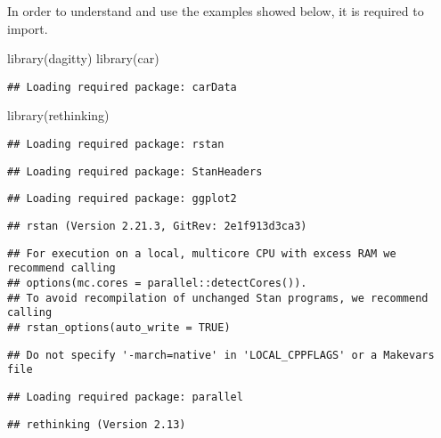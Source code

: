 \documentclass[
]{article}
\newenvironment{Shaded}{\begin{snugshade}}{\end{snugshade}}
\newcommand{\FunctionTok}[1]{\textcolor[rgb]{0.00,0.00,0.00}{#1}}
\newcommand{\NormalTok}[1]{#1}
\begin{document}
In order to understand and use the examples showed below, it is required
to import.

\begin{Shaded}
\begin{Highlighting}[]
\FunctionTok{library}\NormalTok{(dagitty)}
\FunctionTok{library}\NormalTok{(car)}
\end{Highlighting}
\end{Shaded}

\begin{verbatim}
## Loading required package: carData
\end{verbatim}

\begin{Shaded}
\begin{Highlighting}[]
\FunctionTok{library}\NormalTok{(rethinking)}
\end{Highlighting}
\end{Shaded}

\begin{verbatim}
## Loading required package: rstan
\end{verbatim}

\begin{verbatim}
## Loading required package: StanHeaders
\end{verbatim}

\begin{verbatim}
## Loading required package: ggplot2
\end{verbatim}

\begin{verbatim}
## rstan (Version 2.21.3, GitRev: 2e1f913d3ca3)
\end{verbatim}

\begin{verbatim}
## For execution on a local, multicore CPU with excess RAM we recommend calling
## options(mc.cores = parallel::detectCores()).
## To avoid recompilation of unchanged Stan programs, we recommend calling
## rstan_options(auto_write = TRUE)
\end{verbatim}

\begin{verbatim}
## Do not specify '-march=native' in 'LOCAL_CPPFLAGS' or a Makevars file
\end{verbatim}

\begin{verbatim}
## Loading required package: parallel
\end{verbatim}

\begin{verbatim}
## rethinking (Version 2.13)
\end{verbatim}
\end{document}
